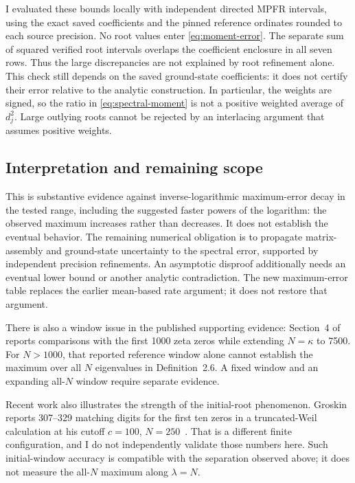 \documentclass[11pt,a4paper]{article}
\begin{document}
I evaluated these bounds locally with independent directed MPFR
intervals, using the exact saved coefficients and the pinned reference
ordinates rounded to each source precision. No root values enter
\eqref{eq:moment-error}. The separate sum of squared verified root
intervals overlaps the coefficient enclosure in all seven rows.
Thus the large discrepancies are not explained by root refinement
alone. This check still depends on the saved ground-state coefficients:
it does not certify their error relative to the analytic construction.
In particular, the weights are signed, so the ratio in
\eqref{eq:spectral-moment} is not a positive weighted average of $d_j^2$.
Large outlying roots cannot be rejected by an interlacing argument that
assumes positive weights.

\subsection*{Interpretation and remaining scope}

This is substantive evidence against inverse-logarithmic maximum-error
decay in the tested range, including the suggested faster powers of
the logarithm: the observed maximum increases rather than decreases.
It does not establish the eventual behavior. The remaining numerical
obligation is to propagate matrix-assembly and ground-state uncertainty
to the spectral error, supported by independent precision refinements.
An asymptotic disproof additionally needs an eventual lower bound or
another analytic contradiction. The new maximum-error table replaces
the earlier mean-based rate argument; it does not restore that argument.

There is also a window issue in the published supporting evidence:
Section~4 of~\cite{Sliwinski2026} reports comparisons with the first
1000 zeta zeros while extending $N=\kappa$ to 7500. For $N>1000$,
that reported reference window alone cannot establish the maximum
over all $N$ eigenvalues in Definition~2.6. A fixed window and an
expanding all-$N$ window require separate evidence.

Recent work also illustrates the strength of the initial-root phenomenon.
Groskin reports 307--329 matching digits for the first ten zeros in a
truncated-Weil calculation at his cutoff $c=100$, $N=250$~\cite{Groskin2026}.
That is a different finite configuration, and I do not independently
validate those numbers here. Such initial-window accuracy is compatible
with the separation observed above; it does not measure the all-$N$
maximum along $\lambda=N$.
\end{document}
